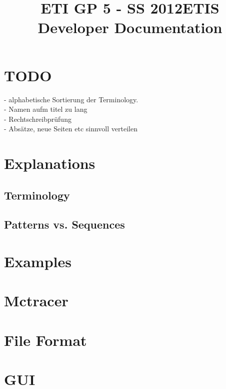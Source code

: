 \documentclass{scrartcl}
\title{ETI GP 5 - SS 2012\newline ETIS Developer Documentation}
\begin{document}
\maketitle
\tableofcontents
\newpage

\section{TODO}
- alphabetische Sortierung der Terminology. \\
- Namen aufm titel zu lang \\
- Rechtschreibprüfung \\
- Absätze, neue Seiten etc sinnvoll verteilen \\

\section{Explanations}
	\subsection{Terminology} 
	\subsection{Patterns vs. Sequences} 
\section{Examples} 
\section{Mctracer} 
\section{File Format} 
\section{GUI} 
\end{document}
